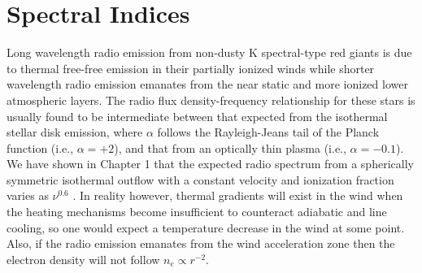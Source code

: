 \section{Spectral Indices}
\label{sec:6.6}
Long wavelength radio emission from non-dusty K spectral-type red giants is due to thermal free-free emission in their partially ionized winds while shorter wavelength radio emission emanates from the near static and more ionized lower atmospheric layers. The radio flux density-frequency relationship for these stars is usually found to be intermediate between that expected from the isothermal stellar disk emission, where $\alpha$ follows the Rayleigh-Jeans tail of the Planck function (i.e., $\alpha = +2$), and that from an optically thin plasma (i.e., $\alpha = -0.1$). We have shown in Chapter 1 that the expected radio spectrum from a spherically symmetric isothermal outflow with a constant velocity and ionization fraction varies as $\nu ^{0.6}$ \citep{wright_1975,olnon_1975,panagia_1975}. In reality however, thermal gradients will exist in the wind when the heating mechanisms become insufficient to counteract adiabatic and line cooling, so one would expect a temperature decrease in the wind at some point. Also, if the radio emission emanates from the wind acceleration zone then the electron density will not follow $n_{e} \propto r^{-2}$. 

